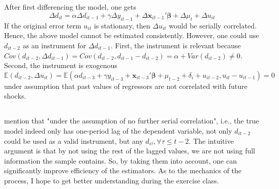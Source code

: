 \documentclass[]{article}
\begin{document}
\subsection{}
After first differencing the model, one gets
\begin{equation}
	\Delta d_{it} = \alpha\Delta d_{it-1} + \gamma\Delta y_{it-1} + \Delta\mathbf{x}_{it-1}'\mathbf{\beta} + \Delta\mu_t + \Delta u_{it} \nonumber
\end{equation}
If the original error term $u_{it}$ is stationary, then $\Delta u_{it}$ would be serially correlated. Hence, the above model cannot be estimated consistently. However, one could use $d_{it-2}$ as an instrument for $\Delta d_{it-1}$. First, the instrument is relevant because $Cov(d_{it-2}, \Delta d_{it-1}) = Cov(d_{it-2}, d_{it-1} - d_{it-2}) = \alpha + Var(d_{it-2}) \neq 0$. Second, the instrument is exogenous
\begin{equation}
	\mathbb{E}(d_{it-2}, \Delta u_{it}) = \mathbb{E}(\alpha d_{it-3} + \gamma y_{it-3} + \mathbf{x}_{it-3}'\mathbf{\beta} + \mu_{t-2} + \delta_i + u_{it-2}, u_{it} - u_{it-1}) = 0 \nonumber
\end{equation}
under assumption that past values of regressors are not correlated with future shocks.

\subsection{}
\textcite{AJRY_2008} mention that "under the assumption of no further serial correlation", i.e., the true model indeed only has one-period lag of the dependent variable, not only $d_{it-2}$ could be used as a valid instrument, but any $d_{i\tau}, \forall \tau \leq t-2$. The intuitive argument is that by not using the rest of the lagged values, we are not using full information the sample contains. So, by taking them into account, one can significantly improve efficiency of the estimators. As to the mechanics of the process, I hope to get better understanding during the exercise class.
\end{document}
